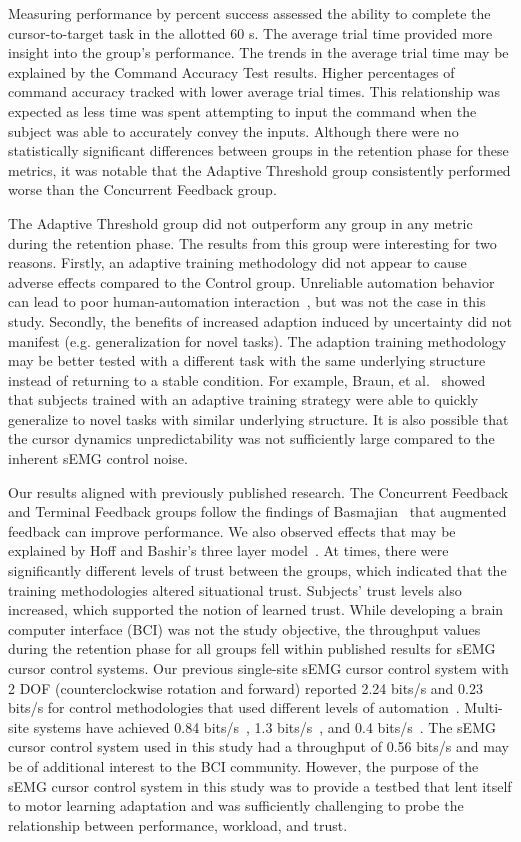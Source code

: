 Measuring performance by percent success assessed the ability to complete the cursor-to-target task in the allotted 60 s.
The average trial time provided more insight into the group's performance.
The trends in the average trial time may be explained by the Command Accuracy Test results.
Higher percentages of command accuracy tracked with lower average trial times.
This relationship was expected as less time was spent attempting to input the command when the subject was able to accurately convey the inputs.
Although there were no statistically significant differences between groups in the retention phase for these metrics, it was notable that the Adaptive Threshold group consistently performed worse than the Concurrent Feedback group.

The Adaptive Threshold group did not outperform any group in any metric during the retention phase.
The results from this group were interesting for two reasons.
Firstly, an adaptive training methodology did not appear to cause adverse effects compared to the Control group.
Unreliable automation behavior can lead to poor human-automation interaction~\cite{RN54}, but was not the case in this study.
Secondly, the benefits of increased adaption induced by uncertainty did not manifest (e.g. generalization for novel tasks).
The adaption training methodology may be better tested with a different task with the same underlying structure instead of returning to a stable condition.
For example, Braun, et al.~\cite{RN36} showed that subjects trained with an adaptive training strategy were able to quickly generalize to novel tasks with similar underlying structure.
It is also possible that the cursor dynamics unpredictability was not sufficiently large compared to the inherent sEMG control noise.

Our results aligned with previously published research.
The Concurrent Feedback and Terminal Feedback groups follow the findings of Basmajian~\cite{RN27} that augmented feedback can improve performance.
We also observed effects that may be explained by Hoff and Bashir's three layer model~\cite{RN39}.
At times, there were significantly different levels of trust between the groups, which indicated that the training methodologies altered situational trust.
Subjects' trust levels also increased, which supported the notion of learned trust.
While developing a brain computer interface (BCI) was not the study objective, the throughput values during the retention phase for all groups fell within published results for sEMG cursor control systems.
Our previous single-site sEMG cursor control system with 2 DOF (counterclockwise rotation and forward) reported 2.24 bits/s and 0.23 bits/s for control methodologies that used different levels of automation~\cite{RN45}.
Multi-site systems have achieved 0.84 bits/s~\cite{RN55}, 1.3 bits/s~\cite{RN56}, and 0.4 bits/s~\cite{RN57}.
The sEMG cursor control system used in this study had a throughput of 0.56 bits/s and may be of additional interest to the BCI community.
However, the purpose of the sEMG cursor control system in this study was to provide a testbed that lent itself to motor learning adaptation and was sufficiently challenging to probe the relationship between performance, workload, and trust.

